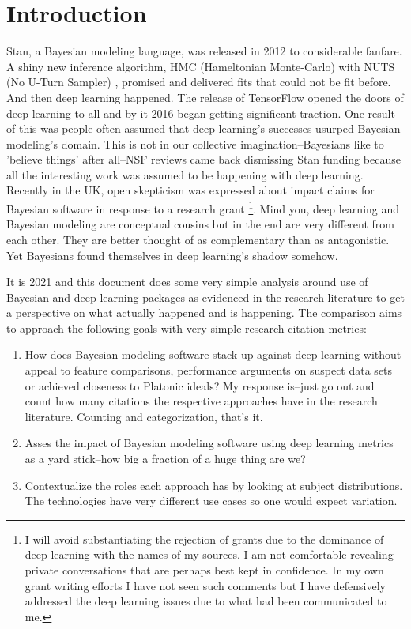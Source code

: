 \documentclass[AMA,STIX1COL]{WileyNJD-v2}
\begin{document}
\section{Introduction}\label{sec1}

Stan, a Bayesian modeling language, was released in 2012 to considerable fanfare. A shiny new inference algorithm, HMC (Hameltonian Monte-Carlo) with NUTS (No U-Turn Sampler) \cite{hoffman2014no}, promised and delivered fits that could not be fit before. And then deep learning happened. The release of TensorFlow \cite{abadi2016tensorflow} opened the doors of deep learning to all and by it 2016 began getting significant traction. One result of this was people often assumed that deep learning's successes usurped Bayesian modeling's domain. This is not in our collective imagination--Bayesians like to 'believe things' after all--NSF reviews came back dismissing Stan funding because all the interesting work was assumed to be happening with deep learning. Recently in the UK, open skepticism was expressed about impact claims for Bayesian software in response to a research grant \footnote{\label{one}I will avoid substantiating the rejection of grants due to the dominance of deep learning with the names of my sources. I am not comfortable revealing private conversations that are perhaps best kept in confidence. In my own grant writing efforts I have not seen such comments but I have defensively addressed the deep learning issues due to what had been communicated to me.}. Mind you, deep learning and Bayesian modeling are conceptual cousins but in the end are very different from each other. They are better thought of as complementary than as antagonistic. Yet Bayesians found themselves in deep learning's shadow somehow. 

It is 2021 and this document does some very simple analysis around use of Bayesian and deep learning packages as evidenced in the research literature to get a perspective on what actually happened and is happening. The comparison aims to approach the following goals with very simple research citation metrics:

\begin{enumerate}
    \item How does Bayesian modeling software stack up against deep learning without appeal to feature comparisons, performance arguments on suspect data sets or achieved closeness to Platonic ideals? My response is--just go out and count how many citations the respective approaches have in the research literature. Counting and categorization, that's it. 
    \item Asses the impact of Bayesian modeling software using deep learning metrics as a yard stick--how big a fraction of a huge thing are we?
    \item Contextualize the roles each approach has by looking at subject distributions. The technologies have very different use cases so one would expect variation.
\end{enumerate}
\end{document}
